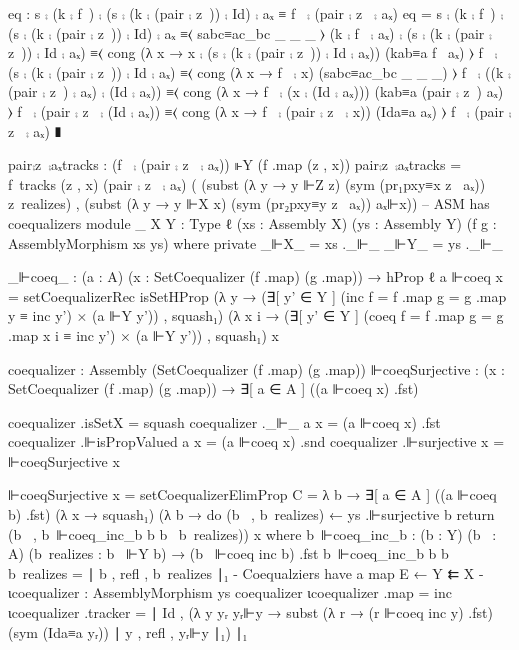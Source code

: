                             eq : s ⨾ (k ⨾ f~) ⨾ (s ⨾ (k ⨾ (pair ⨾ z~)) ⨾ Id) ⨾ aₓ ≡ f~ ⨾ (pair ⨾ z~ ⨾ aₓ)
                            eq =
                              s ⨾ (k ⨾ f~) ⨾ (s ⨾ (k ⨾ (pair ⨾ z~)) ⨾ Id) ⨾ aₓ
                                ≡⟨ sabc≡ac_bc _ _ _ ⟩
                              (k ⨾ f~ ⨾ aₓ) ⨾ (s ⨾ (k ⨾ (pair ⨾ z~)) ⨾ Id ⨾ aₓ)
                                ≡⟨ cong (λ x → x ⨾ (s ⨾ (k ⨾ (pair ⨾ z~)) ⨾ Id ⨾ aₓ)) (kab≡a f~ aₓ) ⟩
                              f~ ⨾ (s ⨾ (k ⨾ (pair ⨾ z~)) ⨾ Id ⨾ aₓ)
                                ≡⟨ cong (λ x → f~ ⨾ x) (sabc≡ac_bc _ _ _) ⟩
                              f~ ⨾ ((k ⨾ (pair ⨾ z~) ⨾ aₓ) ⨾ (Id ⨾ aₓ))
                                ≡⟨ cong (λ x → f~ ⨾ (x ⨾ (Id ⨾ aₓ))) (kab≡a (pair ⨾ z~) aₓ) ⟩
                              f~ ⨾ (pair ⨾ z~ ⨾ (Id ⨾ aₓ))
                                ≡⟨ cong (λ x → f~ ⨾ (pair ⨾ z~ ⨾ x)) (Ida≡a aₓ) ⟩
                              f~ ⨾ (pair ⨾ z~ ⨾ aₓ)
                                ∎

                            pair⨾z~⨾aₓtracks : (f~ ⨾ (pair ⨾ z~ ⨾ aₓ)) ⊩Y (f .map (z , x))
                            pair⨾z~⨾aₓtracks =
                              f~tracks
                                (z , x)
                                (pair ⨾ z~ ⨾ aₓ)
                                ( (subst (λ y → y ⊩Z z) (sym (pr₁pxy≡x z~ aₓ)) z~realizes)
                                , (subst (λ y → y ⊩X x) (sym (pr₂pxy≡y z~ aₓ)) aₓ⊩x))
  -- ASM has coequalizers
  module _
    {X Y : Type ℓ}
    (xs : Assembly X)
    (ys : Assembly Y)
    (f g : AssemblyMorphism xs ys)
    where
      private
        _⊩X_ = xs ._⊩_
        _⊩Y_ = ys ._⊩_

      _⊩coeq_ : (a : A) (x : SetCoequalizer (f .map) (g .map)) → hProp ℓ
      a ⊩coeq x =
        setCoequalizerRec
        isSetHProp
        (λ y → (∃[ y' ∈ Y ] (inc {f = f .map} {g = g .map} y ≡ inc y') × (a ⊩Y y')) , squash₁)
        (λ x i → (∃[ y' ∈ Y ] (coeq {f = f .map} {g = g .map} x i ≡ inc y') × (a ⊩Y y')) , squash₁)
        x

      coequalizer : Assembly (SetCoequalizer (f .map) (g .map))
      ⊩coeqSurjective : (x : SetCoequalizer (f .map) (g .map)) → ∃[ a ∈ A ] ((a ⊩coeq x) .fst)
   
      coequalizer .isSetX = squash
      coequalizer ._⊩_ a x = (a ⊩coeq x) .fst
      coequalizer .⊩isPropValued a x = (a ⊩coeq x) .snd
      coequalizer .⊩surjective x = ⊩coeqSurjective x

      ⊩coeqSurjective x =
        setCoequalizerElimProp
          {C = λ b → ∃[ a ∈ A ] ((a ⊩coeq b) .fst)}
          (λ x → squash₁)
          (λ b → do
                  (b~ , b~realizes) ← ys .⊩surjective b
                  return (b~ , b~⊩coeq_inc_b b b~ b~realizes))
          x where
            b~⊩coeq_inc_b : (b : Y) (b~ : A) (b~realizes : b~ ⊩Y b) → (b~ ⊩coeq inc b) .fst
            b~⊩coeq_inc_b b b~ b~realizes = ∣ b , refl , b~realizes ∣₁
      {-
        Coequalziers have a map E ← Y ⇇ X
      -}
      ιcoequalizer : AssemblyMorphism ys coequalizer
      ιcoequalizer .map = inc
      ιcoequalizer .tracker = ∣ Id , (λ y yᵣ yᵣ⊩y → subst (λ r → (r ⊩coeq inc y) .fst) (sym (Ida≡a yᵣ)) ∣ y , refl , yᵣ⊩y ∣₁) ∣₁

